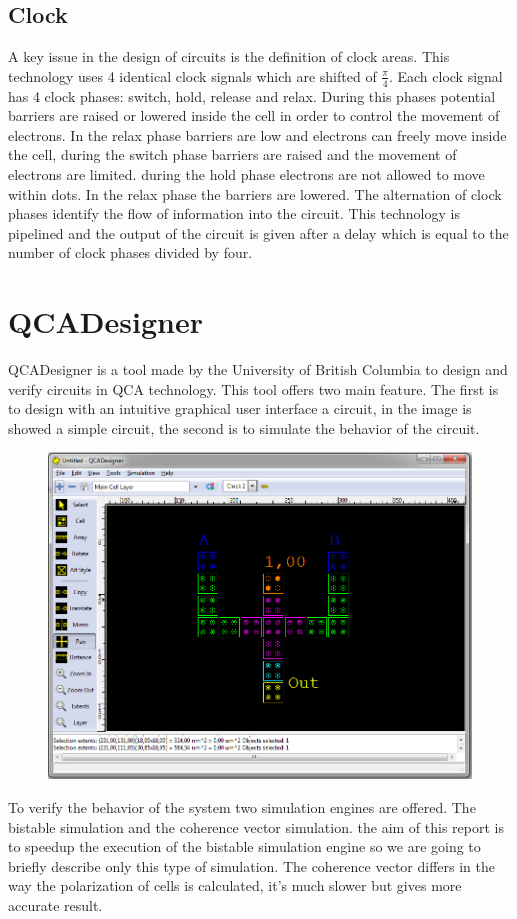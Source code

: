 \subsection{Clock}
\label{delay}
A key issue in the design of circuits is the definition of clock areas. This technology uses 4 identical clock signals which are shifted of $\frac{\pi}{4}$. Each clock signal has 4 clock phases: switch, hold, release and relax. During this phases potential barriers are raised or lowered inside the cell in order to control the movement of electrons. In the relax phase barriers are low and electrons can freely move inside the cell, during the switch phase barriers are raised and the movement of electrons are limited. during the hold phase electrons are not allowed to move within dots. In the relax phase the barriers are lowered. The alternation of clock phases identify the flow of information into the circuit. \newline
This technology is pipelined and the output of the circuit is given after a delay which is equal to the number of clock phases divided by four.

\section{QCADesigner}
QCADesigner is a tool made by the University of British Columbia to design and verify circuits in QCA technology. This tool offers two main feature. The first is to design with an intuitive graphical user interface a circuit, in the image \label{img:ambiente} is showed a simple circuit, the second is to simulate the behavior of the circuit. 

\begin{figure}
\centering
\includegraphics[scale=0.4]{img/QCADesigner.png}
\label{img:ambiente}
\end{figure}
To verify the behavior of the system two simulation engines are offered. The bistable simulation and the coherence vector simulation. the aim of this report is to speedup the execution of the bistable simulation engine so we are going to briefly describe only this type of simulation. The coherence vector differs in the way the polarization of cells is calculated, it's much slower but gives more accurate result.



